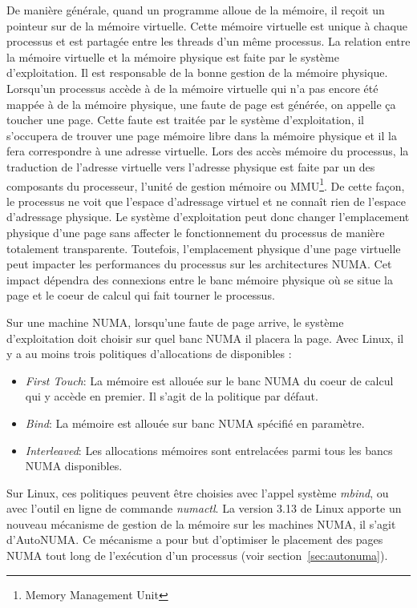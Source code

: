 De manière générale, quand un programme alloue de la mémoire, il reçoit un pointeur sur de la mémoire virtuelle.
%
Cette mémoire virtuelle est unique à chaque processus et est partagée entre les threads d'un même processus.
%
La relation entre la mémoire virtuelle et la mémoire physique est faite par le système d'exploitation.
%
Il est responsable de la bonne gestion de la mémoire physique.
%
Lorsqu'un processus accède à de la mémoire virtuelle qui n'a pas encore été mappée à de la mémoire physique, une faute de page est générée, on appelle ça toucher une page.
%
Cette faute est traitée par le système d'exploitation, il s'occupera de trouver une page mémoire libre dans la mémoire physique et il la fera correspondre à une adresse virtuelle.
%
Lors des accès mémoire du processus, la traduction de l'adresse virtuelle vers l'adresse physique est faite par un des composants du processeur, l'unité de gestion mémoire ou MMU\footnote{Memory Management Unit}.
%
De cette façon, le processus ne voit que l'espace d'adressage virtuel et ne connaît rien de l'espace d'adressage physique.
%
Le système d'exploitation peut donc changer l'emplacement physique d'une page sans affecter le fonctionnement du processus de manière totalement transparente.
%
Toutefois, l'emplacement physique d'une page virtuelle peut impacter les performances du processus sur les architectures NUMA.
%
Cet impact dépendra des connexions entre le banc mémoire physique où se situe la page et le coeur de calcul qui fait tourner le processus.

Sur une machine NUMA, lorsqu'une faute de page arrive, le système d'exploitation doit choisir sur quel banc NUMA il placera la page.
%
Avec Linux, il y a au moins trois politiques d'allocations de disponibles :
\begin{itemize}
        \item {\em First Touch}: La mémoire est allouée sur le banc NUMA du coeur de calcul qui y accède en premier.
                         Il s'agit de la politique par défaut.
        \item {\em Bind}: La mémoire est allouée sur banc NUMA spécifié en paramètre.
        \item {\em Interleaved}: Les allocations mémoires sont entrelacées parmi tous les bancs NUMA disponibles.
\end{itemize}
Sur Linux, ces politiques peuvent être choisies avec l'appel système {\em mbind}, ou avec l'outil en ligne de commande {\em numactl}.
%
La version 3.13 de Linux apporte un nouveau mécanisme de gestion de la mémoire sur les machines NUMA, il s'agit d'AutoNUMA.
%
Ce mécanisme a pour but d'optimiser le placement des pages NUMA tout long de l'exécution d'un processus (voir section~\ref{sec:autonuma}).

